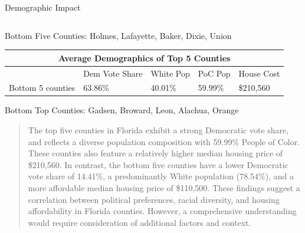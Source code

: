 \documentclass[xcolor=dvipsnames]{beamer}
\newlength{\onecolwid}
\newlength{\twocolwid}
\begin{document}
\begin{frame}[t]
\begin{columns}[t]
\begin{column}{\twocolwid}
\begin{columns}[t,totalwidth=\twocolwid]
\begin{column}{\onecolwid}
\begin{block}{Demographic Impact}
\begin{tabular}{ |p{5.2cm}|p{5.9cm}|p{5cm}|p{4.2cm}|p{5cm}|}
\end{tabular}
\newline
\newline
Bottom Five Counties: Holmes, Lafayette, Baker, Dixie, Union
\newline
\begin{tabular}{ |p{5.2cm}|p{5.9cm}|p{5cm}|p{4.2cm}|p{5cm}|}

 \hline
 \multicolumn{5}{|c|}{Average Demographics of Top 5 Counties} \\
 \hline
 & Dem Vote Share &White Pop &PoC Pop & House Cost\\
 \hline
 Bottom 5 counties   & 63.86\%    &40.01\% &  59.99\%  & \$210,560\\
 \hline

\end{tabular}
\newline
\newline
Bottom Top Counties: Gadsen, Broward, Leon, Alachua, Orange

\begin{quote}
The top five counties in Florida exhibit a strong Democratic vote share, and reflects a diverse population composition with 59.99\% People of Color. These counties also feature a relatively higher median housing price of \$210,560. In contrast, the bottom five counties have a lower Democratic vote share of 14.41\%, a predominantly White population (78.54\%), and a more affordable median housing price of \$110,500. These findings suggest a correlation between political preferences, racial diversity, and housing affordability in Florida counties. However, a comprehensive understanding would require consideration of additional factors and context.
\end{quote}
\end{block}



\end{column} %

\end{columns} %





\end{column}
\end{columns}
\end{frame}
\end{document}
